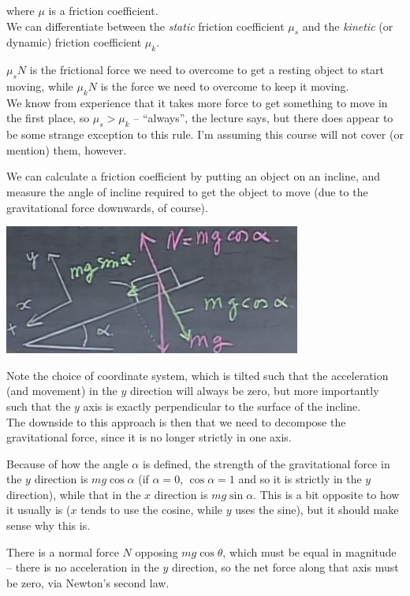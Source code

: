 \documentclass[12pt,a4paper]{report}
\begin{document}
where $\mu$ is a friction coefficient.\\
We can differentiate between the \emph{static} friction coefficient $\mu_s$ and the \emph{kinetic} (or dynamic) friction coefficient $\mu_k$.

$\mu_s N$ is the frictional force we need to overcome to get a resting object to start moving, while $\mu_k N$ is the force we need to overcome to keep it moving.\\
We know from experience that it takes more force to get something to move in the first place, so $\mu_s > \mu_k$ -- ``always'', the lecture says, but there does appear to be some strange exception to this rule. I'm assuming this course will not cover (or mention) them, however.

We can calculate a friction coefficient by putting an object on an incline, and measure the angle of incline required to get the object to move (due to the gravitational force downwards, of course).

\begin{center}
\includegraphics[scale=0.8]{Graphics/lec8_friction_incline}
\end{center}

Note the choice of coordinate system, which is tilted such that the acceleration (and movement) in the $y$ direction will always be zero, but more importantly such that the $y$ axis is exactly perpendicular to the surface of the incline.\\
The downside to this approach is then that we need to decompose the gravitational force, since it is no longer strictly in one axis.

Because of how the angle $\alpha$ is defined, the strength of the gravitational force in the $y$ direction is $m g \cos \alpha$ (if $\alpha = 0$, $\cos \alpha = 1$ and so it is strictly in the $y$ direction), while that in the $x$ direction is $m g \sin \alpha$. This is a bit opposite to how it usually is ($x$ tends to use the cosine, while $y$ uses the sine), but it should make sense why this is.

There is a normal force $N$ opposing $m g \cos \theta$, which must be equal in magnitude -- there is no acceleration in the $y$ direction, so the net force along that axis must be zero, via Newton's second law.
\end{document}
